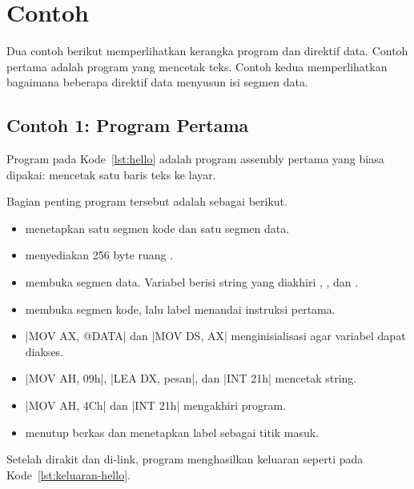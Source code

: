\section{Contoh}
\label{sec:contoh-bab7}

Dua contoh berikut memperlihatkan kerangka program dan direktif data.
Contoh pertama adalah program  yang mencetak teks. Contoh
kedua memperlihatkan bagaimana beberapa direktif data menyusun isi
segmen data.

\subsection{Contoh 1: Program Pertama}

Program pada Kode~\ref{lst:hello} adalah program assembly pertama
yang biasa dipakai: mencetak satu baris teks ke layar.



Bagian penting program tersebut adalah sebagai berikut.

\begin{itemize}
    \item {} menetapkan satu segmen kode dan satu
          segmen data.
    \item {} menyediakan 256 byte ruang .
    \item {} membuka segmen data. Variabel 
          berisi string yang diakhiri , , dan
          .
    \item {} membuka segmen kode, lalu label 
          menandai instruksi pertama.
    \item \lstasm|MOV AX, @DATA| dan \lstasm|MOV DS, AX|
          menginisialisasi  agar variabel dapat diakses.
    \item \lstasm|MOV AH, 09h|, \lstasm|LEA DX, pesan|, dan
          \lstasm|INT 21h| mencetak string.
    \item \lstasm|MOV AH, 4Ch| dan \lstasm|INT 21h| mengakhiri
          program.
    \item {} menutup berkas dan menetapkan label
           sebagai titik masuk.
\end{itemize}

Setelah dirakit dan di-link, program menghasilkan keluaran seperti
pada Kode~\ref{lst:keluaran-hello}.


